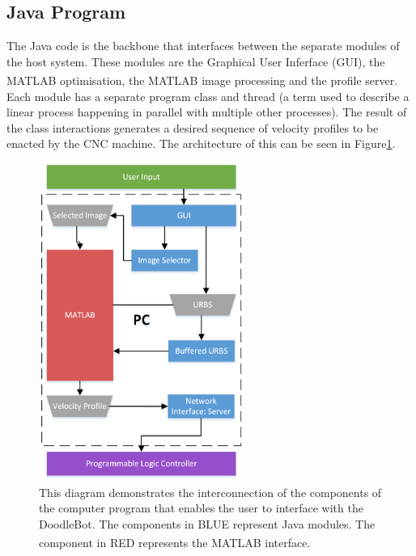 \subsection{Java Program}
The Java code is the backbone that interfaces between the separate modules of the host system. These modules are the Graphical User Inferface (GUI), the MATLAB\textsuperscript{\textregistered} optimisation, the MATLAB\textsuperscript{\textregistered} image processing and the profile server. Each module has a separate program class and thread (a term used to describe a linear process happening in parallel with multiple other processes). The result of the class interactions generates a desired sequence of velocity profiles to be enacted by the CNC machine. The architecture of this can be seen in Figure\ref{fig:javaOverview}.


\begin{figure}[htbp] 
\centering
\includegraphics[width=0.6\textwidth]{figures/implementation/humanMachineInterface/systemDiagram2.png}
\caption[Human Machine Interface System Diagram]{This diagram demonstrates the interconnection of the components of the computer program that enables the user to interface with the DoodleBot. The components in BLUE represent Java modules. The component in RED represents the MATLAB\textsuperscript{\textregistered} interface.
\label{fig:javaOverview}}
\end{figure}

